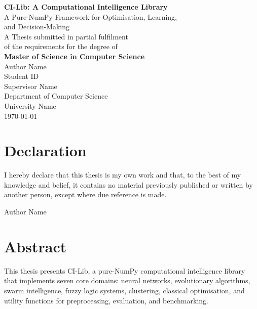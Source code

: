 \documentclass[12pt,a4paper,twoside]{report}
\begin{document}
\begin{titlepage}
  \begin{center}
    \vspace*{2cm}
    {\Huge \bfseries CI-Lib: A Computational Intelligence Library}\\[0.5cm]
    {\Large A Pure-NumPy Framework for Optimisation, Learning,\\and Decision-Making}\\[2cm]
    {\large A Thesis submitted in partial fulfilment\\of the requirements for the degree of}\\[0.5cm]
    {\Large \bfseries Master of Science in Computer Science}\\[2cm]
    {\large Author Name}\\[0.3cm]
    {\large Student ID}\\[1cm]
    {\large Supervisor Name}\\[0.3cm]
    {\large Department of Computer Science}\\[0.3cm]
    {\large University Name}\\[2cm]
    {\large \today}
  \end{center}
\end{titlepage}

\chapter*{Declaration}
I hereby declare that this thesis is my own work and that, to the best of my
knowledge and belief, it contains no material previously published or written
by another person, except where due reference is made.

\vspace{1cm}
\hfill Author Name \hfill

\chapter*{Abstract}
This thesis presents CI-Lib, a pure-NumPy computational intelligence library
that implements seven core domains: neural networks, evolutionary algorithms,
swarm intelligence, fuzzy logic systems, clustering, classical optimisation,
and utility functions for preprocessing, evaluation, and benchmarking.
\end{document}
